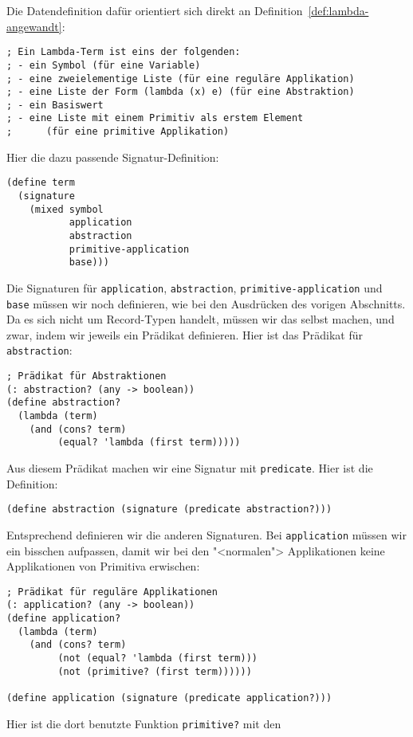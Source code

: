 Die Datendefinition dafür orientiert sich direkt an
Definition~\ref{def:lambda-angewandt}:
%
\begin{lstlisting}
; Ein Lambda-Term ist eins der folgenden:
; - ein Symbol (für eine Variable)
; - eine zweielementige Liste (für eine reguläre Applikation)
; - eine Liste der Form (lambda (x) e) (für eine Abstraktion)
; - ein Basiswert
; - eine Liste mit einem Primitiv als erstem Element
;      (für eine primitive Applikation)
\end{lstlisting}
%
Hier die dazu passende Signatur-Definition:
%
\begin{lstlisting}
(define term
  (signature
    (mixed symbol
           application
           abstraction
           primitive-application
           base)))
\end{lstlisting}
%
Die Signaturen für \lstinline{application}, \lstinline{abstraction},
\lstinline{primitive-application} und \lstinline{base} müssen wir noch
definieren, wie bei den Ausdrücken des vorigen Abschnitts.
Da es sich nicht um Record-Typen handelt, müssen wir das
selbst machen, und zwar, indem wir jeweils ein Prädikat definieren.
Hier ist das Prädikat für \lstinline{abstraction}:
%
\begin{lstlisting}
; Prädikat für Abstraktionen
(: abstraction? (any -> boolean))
(define abstraction?
  (lambda (term)
    (and (cons? term)
         (equal? 'lambda (first term)))))
\end{lstlisting}
%
Aus diesem Prädikat machen wir eine Signatur mit
\lstinline{predicate}.  Hier ist die Definition:
%
\begin{lstlisting}
(define abstraction (signature (predicate abstraction?)))
\end{lstlisting}
%
%
Entsprechend definieren wir die anderen Signaturen.  Bei
\lstinline{application} müssen wir ein bisschen aufpassen, damit wir
bei den "<normalen"> Applikationen keine Applikationen von Primitiva
erwischen:
%
\begin{lstlisting}
; Prädikat für reguläre Applikationen
(: application? (any -> boolean))
(define application?
  (lambda (term)
    (and (cons? term)
         (not (equal? 'lambda (first term)))
         (not (primitive? (first term))))))

(define application (signature (predicate application?)))
\end{lstlisting}
%
Hier ist die dort benutzte Funktion \lstinline{primitive?} mit den
